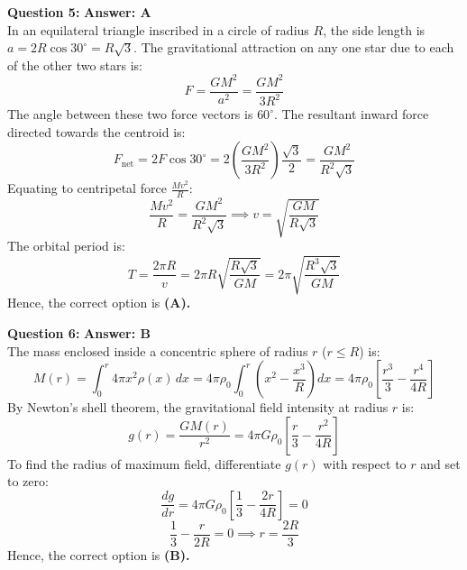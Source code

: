 \documentclass[11pt,a4paper]{article}
\begin{document}
\begin{tcolorbox}[solbox]
  \textbf{\textcolor{primaryDark}{Question 5:}} \hfill \textbf{\textcolor{l3Crimson}{Answer: A}}\\
  \vspace{3pt}
  In an equilateral triangle inscribed in a circle of radius $R$, the side length is $a = 2R\cos 30^\circ = R\sqrt{3}$.
\vspace{3pt}
The gravitational attraction on any one star due to each of the other two stars is:
$$F = \frac{GM^2}{a^2} = \frac{GM^2}{3R^2}$$
The angle between these two force vectors is $60^\circ$. The resultant inward force directed towards the centroid is:
$$F_{\text{net}} = 2 F \cos 30^\circ = 2\left(\frac{GM^2}{3R^2}\right)\frac{\sqrt{3}}{2} = \frac{GM^2}{R^2\sqrt{3}}$$
\vspace{3pt}
Equating to centripetal force $\frac{M v^2}{R}$:
$$\frac{M v^2}{R} = \frac{GM^2}{R^2\sqrt{3}} \implies v = \sqrt{\frac{GM}{R\sqrt{3}}}$$
\vspace{3pt}
The orbital period is:
$$T = \frac{2\pi R}{v} = 2\pi R \sqrt{\frac{R\sqrt{3}}{GM}} = 2\pi \sqrt{\frac{R^3\sqrt{3}}{GM}}$$
\vspace{3pt}
Hence, the correct option is \textbf{(A)}\textbf{.}
\end{tcolorbox}
\vspace{3pt}

\begin{tcolorbox}[solbox]
  \textbf{\textcolor{primaryDark}{Question 6:}} \hfill \textbf{\textcolor{l3Crimson}{Answer: B}}\\
  \vspace{3pt}
  The mass enclosed inside a concentric sphere of radius $r$ ($r \le R$) is:
$$M(r) = \int_0^r 4\pi x^2 \rho(x)\,dx = 4\pi\rho_0 \int_0^r \left(x^2 - \frac{x^3}{R}\right)dx = 4\pi\rho_0 \left[\frac{r^3}{3} - \frac{r^4}{4R}\right]$$
\vspace{3pt}
By Newton's shell theorem, the gravitational field intensity at radius $r$ is:
$$g(r) = \frac{G M(r)}{r^2} = 4\pi G \rho_0 \left[\frac{r}{3} - \frac{r^2}{4R}\right]$$
\vspace{3pt}
To find the radius of maximum field, differentiate $g(r)$ with respect to $r$ and set to zero:
$$\frac{dg}{dr} = 4\pi G \rho_0 \left[\frac{1}{3} - \frac{2r}{4R}\right] = 0$$
$$\frac{1}{3} - \frac{r}{2R} = 0 \implies r = \frac{2R}{3}$$
\vspace{3pt}
Hence, the correct option is \textbf{(B)}\textbf{.}
\end{tcolorbox}
\vspace{3pt}
\end{document}
